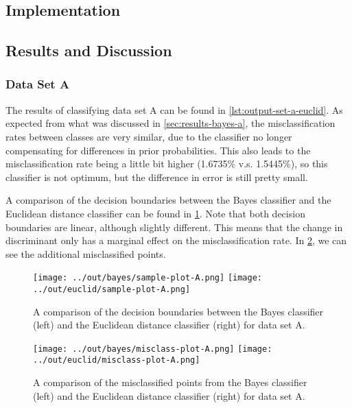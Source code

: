 \documentclass[headings=optiontoheadandtoc,listof=totoc,parskip=full]{scrartcl}
\begin{document}
\subsection{Implementation}
\label{sec:part-2-impl}


\subsection{Results and Discussion}

\subsubsection{Data Set A}

The results of classifying data set A can be found in \cref{lst:output-set-a-euclid}. As expected from what was discussed in \cref{sec:results-bayes-a}, the misclassification rates between classes are very similar, due to the classifier no longer compensating for differences in prior probabilities. This also leads to the misclassification rate being a little bit higher (1.6735\% v.s. 1.5445\%), so this classifier is not optimum, but the difference in error is still pretty small.



A comparison of the decision boundaries between the Bayes classifier and the Euclidean distance classifier can be found in \cref{fig:sample-comparison-A}. Note that both decision boundaries are linear, although slightly different. This means that the change in discriminant only has a marginal effect on the misclassification rate. In \cref{fig:misclass-comparison-A}, we can see the additional misclassified points.

\begin{figure}[H]
	\centering
	\texttt{[image: ../out/bayes/sample-plot-A.png]}
	\texttt{[image: ../out/euclid/sample-plot-A.png]}
	\caption{A comparison of the decision boundaries between the Bayes classifier (left) and the Euclidean distance classifier (right) for data set A.}
	\label{fig:sample-comparison-A}
\end{figure}


\begin{figure}[H]
	\centering
	\texttt{[image: ../out/bayes/misclass-plot-A.png]}
	\texttt{[image: ../out/euclid/misclass-plot-A.png]}
	\caption{A comparison of the misclassified points from the Bayes classifier (left) and the Euclidean distance classifier (right) for data set A.}
	\label{fig:misclass-comparison-A}
\end{figure}
\end{document}
